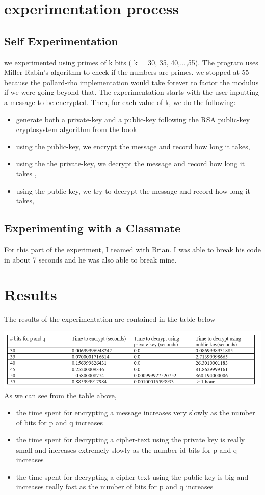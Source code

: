 \documentclass[12pt]{article}
\begin{document}
	\section {experimentation process}
	    \subsection{Self Experimentation}
			we experimented using primes of k bits ( k = 30, 35, 40,...,55). The program uses Miller-Rabin's algorithm to check if the numbers are primes. we stopped at 55 because the pollard-rho implementation would take forever to factor the modulus if we were going beyond that. 
			The experimentation starts with the user inputting a message to be encrypted. Then, for each value of k, we do the following:
			\begin{itemize}
				\item generate both a private-key and a public-key following the RSA public-key cryptosystem algorithm from the book 
				\item using the public-key, we encrypt the message and record how long it takes,
				\item using the the private-key, we decrypt the message and record how long it takes ,
				\item using the public-key, we try to decrypt the message and record how long it takes,
			\end{itemize}
		\subsection{Experimenting with a Classmate}
			For this part of the experiment, I teamed with Brian. I was able to break his code in about 7 seconds and he was also able to break mine.
	\section{Results}
		The results of the experimentation are contained in the table below
		
		
		\includegraphics[width=15cm]{result.PNG}\\[.5cm]	
		
		As we can see from the table above, 
		\begin{itemize}
			\item the time spent for encrypting a message increases very slowly as the number of bits for p and q increases
			\item the time spent for decrypting a cipher-text using the private key is really small and increases extremely slowly as the number id bits for p and q increases
			\item the time spent for decrypting a cipher-text using the public key is big and increases really fast as the number of bits for p and q increases
		\end{itemize}
		
\end{document}
